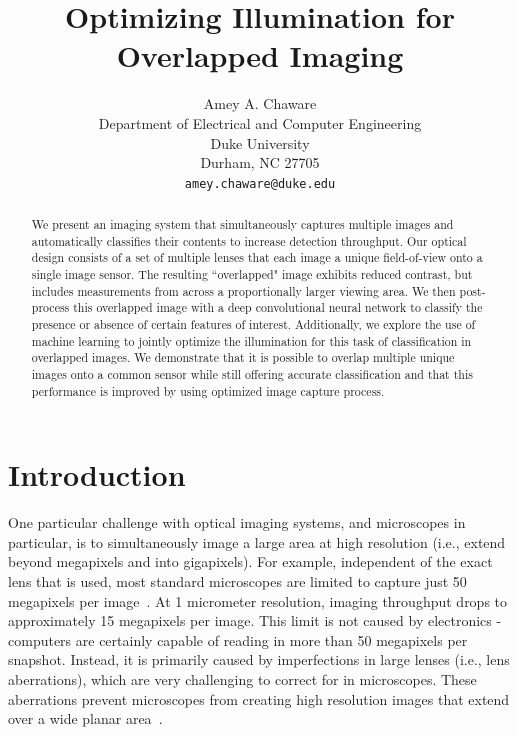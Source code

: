 \documentclass{article}
\title{Optimizing Illumination for Overlapped Imaging}
\author{%
  Amey A. Chaware\\
  Department of Electrical and Computer Engineering\\
  Duke University\\
  Durham, NC 27705 \\
  \texttt{amey.chaware@duke.edu} \\
}
\begin{document}

\maketitle

\begin{abstract}
  
We present an imaging system that simultaneously captures multiple images and automatically classifies their contents to increase detection throughput. Our optical design consists of a set of multiple lenses that each image a unique field-of-view onto a single image sensor. The resulting ``overlapped" image exhibits reduced contrast, but includes measurements from across a proportionally larger viewing area. We then post-process this overlapped image with a deep convolutional neural network to classify the presence or absence of certain features of interest. Additionally, we explore the use of machine learning to jointly optimize the illumination for this task of classification in overlapped images. We demonstrate that it is possible to overlap multiple unique images onto a common sensor while still offering accurate classification and that this performance is improved by using optimized image capture process.

\end{abstract}

\section{Introduction}

One particular challenge with optical imaging systems, and microscopes in particular, is to simultaneously image a large area at high resolution (i.e., extend beyond megapixels and into gigapixels). For example, independent of the exact lens that is used, most standard microscopes are limited to capture just 50 megapixels per image~\cite{Zheng14}. At 1 micrometer resolution, imaging throughput drops to approximately 15 megapixels per image. This limit is not caused by electronics - computers are certainly capable of reading in more than 50 megapixels per snapshot. Instead, it is primarily caused by imperfections in large lenses (i.e., lens aberrations), which are very challenging to correct for in microscopes. These aberrations prevent microscopes from creating high resolution images that extend over a wide planar area~\cite{Lohmann}.
\end{document}
